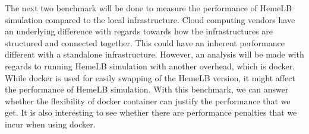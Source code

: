 The next two benchmark will be done to measure the performance of HemeLB simulation compared to the local infrastructure. Cloud computing vendors have an underlying difference with regards towards how the infrastructures are structured and connected together. This could have an inherent performance different with a standalone infrastructure. However, an analysis will be made with regards to running HemeLB simulation with another overhead, which is docker. While docker is used for easily swapping of the HemeLB version, it might affect the performance of HemeLB simulation. With this benchmark, we can answer whether the flexibility of docker container can justify the performance that we get. It is also interesting to see whether there are performance penalties that we incur when using docker.



